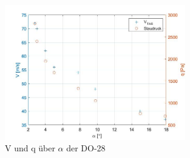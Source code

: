 \begin{figure}[H]
	\centering	\includegraphics[width=0.7\textwidth]{./Bilder/V_q_alpha.jpg}
	\caption{$\mathrm{V}$ und $\mathrm{q}$ über $\alpha$ der DO-28}
	\label{fig:V_q_alpha_DO28}
\end{figure}